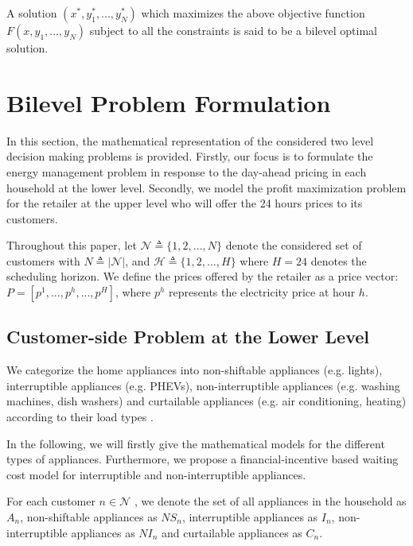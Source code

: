 \documentclass[10pt,journal]{IEEEtran}
\theoremstyle{definition}
\theoremstyle{plain} \newtheorem{theo}{Theorem} \newtheorem{prop}{Proposition}  \newtheorem{lemm}{Lemma}
\begin{document}
A solution $(x^*, y_1^*,...,y_N^*)$ which maximizes the above objective function $F(x,y_{1},...,y_N)$ subject to all the constraints is said to be a bilevel optimal solution. 








\section{Bilevel Problem Formulation} \label{problem formulation}

In this section, the mathematical representation of the considered two level decision making problems is provided. Firstly, our focus is to formulate the energy management problem in response to the day-ahead pricing in each household at the lower level. Secondly, we model the profit maximization problem for the retailer at the upper level who will offer the 24 hours prices to its customers. 

Throughout this paper, let $ \mathcal{N} \triangleq \{1,2,...,N\}$ denote the considered set of customers with $N \triangleq | \mathcal{N} |$, and  $\mathcal{H} \triangleq \{1,2,...,H\}$ where $H = 24$ denotes the scheduling horizon. We define the prices offered by the retailer as a price vector: $P=[p^1,...,p^h,...,p^H]$, where $p^h$ represents the electricity price at hour $h$.

\subsection{Customer-side Problem at the Lower Level}












We categorize the home appliances into non-shiftable appliances (e.g. lights), interruptible appliances (e.g.  PHEVs), non-interruptible appliances (e.g. washing machines, dish washers) and curtailable appliances (e.g.  air conditioning, heating) according to their load types \cite{meng2014optimal}.




In the following, we will firstly give the mathematical models for the different types of appliances. Furthermore, we propose a financial-incentive based waiting cost model for interruptible and non-interruptible appliances.

For each customer $ n \in \mathcal{N} $ , we denote the set of all appliances in the household as $ A_n $, non-shiftable appliances as $NS_n$, interruptible appliances as $I_n$, non-interruptible appliances as $NI_n$ and curtailable appliances as $C_n$. 
\end{document}
